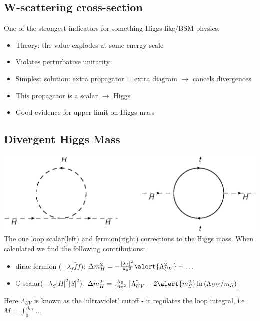 \documentclass{beamer}
\begin{document}
\subsection{W-scattering cross-section}
\begin{frame}{\insertsubsection}
  One of the strongest indicators for something Higgs-like/BSM physics:
  \begin{itemize}
    \item Theory: the value explodes at some energy scale
    \item Violates perturbative unitarity
    \item Simplest solution: extra propagator = extra diagram $\rightarrow$
    cancels divergences
    \item This propagator is a scalar $\rightarrow$ Higgs
    \item Good evidence for upper limit on Higgs mass
  \end{itemize}
\end{frame}

\subsection{Divergent Higgs Mass}
\begin{frame}{\insertsubsection}
  \center\includegraphics[scale=0.4]{oneloop.eps}\\
  The one loop scalar(left) and fermion(right) corrections to the Higgs mass.
  When calculated we find the following contributions:
  \begin{itemize}
    \item dirac fermion ($-\lambda_{f}\bar{f}f$):
    $\Delta m_{H}^{2}=-\frac{|\lambda_{f}|^2}{8\pi^{2}}\alert{\Lambda_{UV}^{2}}
    +\hdots$ 
    \item $\mathbb{C}$-scalar($-\lambda_{S}|H|^{2}|S|^{2}$): 
    $\Delta m_{H}^{2}= \frac{\lambda_{S}}{16\pi^{2}}\left[\Lambda_{UV}^{2}-2
    \alert{m_{S}^{2}}\ln\left(\Lambda_{UV}/m_{S}\right) \right]$
  \end{itemize}
  Here $\Lambda_{UV}$ is known as the `ultraviolet' cutoff - it regulates the loop
  integral, i.e $M=\int_{0}^{\Lambda_{UV}}\hdots$
\end{frame}
\end{document}
